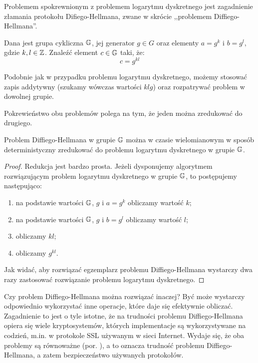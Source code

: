 Problemem spokrewnionym z problemem logarytmu dyskretnego
jest zagadnienie złamania protokołu Difiego-Hellmana,
zwane w skrócie ,,problemem Diffiego-Hellmana''.

\begin{problem}
Dana jest grupa cykliczna $\mathbb{G}$,
jej generator $g \in G$
oraz elementy $a = g^k$ i $b = g^l$,
gdzie $k, l \in \mathbb{Z}$.
Znaleźć element $c \in \mathbb{G}$ taki, że:
\begin{equation}
c = g^{kl}
\end{equation}
\end{problem}

\begin{remark}
Podobnie jak w przypadku problemu logarytmu dyskretnego,
możemy stosować zapis addytywny (szukamy wówczas wartości $klg$)
oraz rozpatrywać problem w dowolnej grupie.
\end{remark}

Pokrewieństwo obu problemów polega na tym,
że jeden można zredukować do drugiego.

\begin{theorem}
Problem Diffiego-Hellmana w grupie $\mathbb{G}$ można
w czasie wielomianowym w sposób deterministyczny
zredukować do problemu logarytmu dyskretnego w grupie $\mathbb{G}$.
\end{theorem}

\begin{proof}
Redukcja jest bardzo prosta.
Jeżeli dysponujemy algorytmem rozwiązującym
problem logarytmu dyskretnego w grupie $\mathbb{G}$,
to postępujemy następująco:
\begin{enumerate}
\item na podstawie wartości $\mathbb{G}$, $g$ i $a = g^k$ obliczamy wartość $k$;
\item na podstawie wartości $\mathbb{G}$, $g$ i $b = g^l$ obliczamy wartość $l$;
\item obliczamy $kl$;
\item obliczamy $g^{kl}$.
\end{enumerate}
Jak widać, aby rozwiązać egzemplarz problemu Diffiego-Hellmana
wystarczy dwa razy zastosować rozwiązanie problemu logarytmu dyskretnego.
\end{proof}

Czy problem Diffiego-Hellmana można rozwiązać inaczej?
Być może wystarczy odpowiednio wykorzystać inne operacje,
które daje się efektywnie obliczać.
Zagadnienie to jest o tyle istotne,
że na trudności problemu Diffiego-Hellmana
opiera się wiele kryptosystemów,
których implementacje są wykorzystywane na codzień,
m.in. w protokole SSL używanym w sieci Internet.
Wydaje się, że oba problemy są równoważne (por. \cite{maurer}),
a to oznacza trudność problemu Diffiego-Hellmana,
a zatem bezpieczeństwo używanych protokołów.


